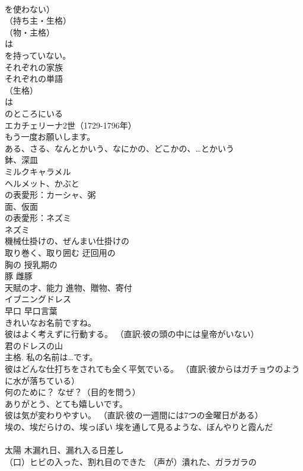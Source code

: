 \documentclass[8pt]{extreport}
\begin{document}
\begin{CJK}{UTF8}{min}
\\	を使わない）
\\	（持ち主・生格） 
\\	（物・主格）	
\\	は
\\	を持っていない。
\\	それぞれの家族
\\	それぞれの単語
\\	（生格）	
\\	は
\\	のところにいる
\\	エカチェリーナ2世（1729-1796年）
\\	もう一度お願いします。
\\	[不定]ある、さる、なんとかいう、なにかの、どこかの、…とかいう
\\	鉢、深皿
\\	ミルクキャラメル
\\	ヘルメット、かぶと
\\	の表愛形：カーシャ、粥
\\	面、仮面
\\	の表愛形：ネズミ
\\	ネズミ
\\	機械仕掛けの、ぜんまい仕掛けの
\\	取り巻く、取り囲む 迂回用の
\\	胸の 授乳期の
\\	豚 雌豚
\\	天賦の才、能力 進物、贈物、寄付
\\	イブニングドレス
\\	早口 早口言葉
\\	きれいなお名前ですね。
\\	彼はよく考えずに行動する。 （直訳:彼の頭の中には皇帝がいない）
\\	君のドレスの山
\\	主格.	私の名前は…です。
\\	彼はどんな仕打ちをされても全く平気でいる。 （直訳:彼からはガチョウのように水が落ちている）
\\	何のために？ なぜ？（目的を問う）
\\	ありがとう、とても嬉しいです。
\\	彼は気が変わりやすい。 （直訳:彼の一週間には7つの金曜日がある）
\\	埃の、埃だらけの、埃っぽい 埃を通して見るような、ぼんやりと霞んだ
\\	[表愛]
\\	太陽 木漏れ日、漏れ入る日差し
\\	（口）ヒビの入った、割れ目のできた （声が）潰れた、ガラガラの

\end{CJK}
\end{document}
